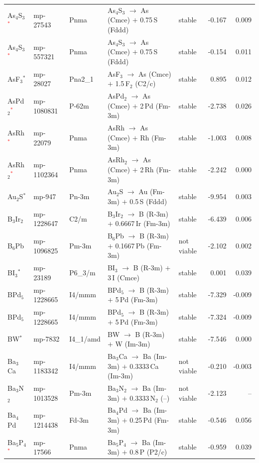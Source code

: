 \begin{longtable}{@{}ll l@{\hspace{4pt}} p{4.6cm} l@{\hspace{4pt}} rr@{}}
As$_{4}$S$_{3}$\textcolor{red}{$^*$} & mp-27543 & Pnma & As$_{4}$S$_{3}$ $\to$ As (Cmce) $+$ 0.75\,S (Fddd) & stable & -0.167 & 0.009 \\
As$_{4}$S$_{3}$\textcolor{red}{$^*$} & mp-557321 & Pnma & As$_{4}$S$_{3}$ $\to$ As (Cmce) $+$ 0.75\,S (Fddd) & stable & -0.154 & 0.011 \\
AsF$_{3}$$^*$ & mp-28027 & Pna2\_1 & AsF$_{3}$ $\to$ As (Cmce) $+$ 1.5\,F$_{2}$ (C2/c) & stable & 0.895 & 0.012 \\
AsPd$_{2}$\textcolor{red}{$^*$} & mp-1080831 & P-62m & AsPd$_{2}$ $\to$ As (Cmce) $+$ 2\,Pd (Fm-3m) & stable & -2.738 & 0.026 \\
AsRh\textcolor{red}{$^*$} & mp-22079 & Pnma & AsRh $\to$ As (Cmce) $+$ Rh (Fm-3m) & stable & -1.003 & 0.008 \\
AsRh$_{2}$\textcolor{red}{$^*$} & mp-1102364 & Pnma & AsRh$_{2}$ $\to$ As (Cmce) $+$ 2\,Rh (Fm-3m) & stable & -2.242 & 0.000 \\
Au$_{2}$S$^*$ & mp-947 & Pn-3m & Au$_{2}$S $\to$ Au (Fm-3m) $+$ 0.5\,S (Fddd) & stable & -9.954 & 0.003 \\
B$_{3}$Ir$_{2}$ & mp-1228647 & C2/m & B$_{3}$Ir$_{2}$ $\to$ B (R-3m) $+$ 0.6667\,Ir (Fm-3m) & stable & -6.439 & 0.006 \\
B$_{6}$Pb & mp-1096825 & Pm-3m & B$_{6}$Pb $\to$ B (R-3m) $+$ 0.1667\,Pb (Fm-3m) & not viable & -2.102 & 0.002 \\
BI$_{3}$$^*$ & mp-23189 & P6\_3/m & BI$_{3}$ $\to$ B (R-3m) $+$ 3\,I (Cmce) & stable & 0.001 & 0.039 \\
BPd$_{5}$ & mp-1228665 & I4/mmm & BPd$_{5}$ $\to$ B (R-3m) $+$ 5\,Pd (Fm-3m) & stable & -7.329 & -0.009 \\
BPd$_{5}$ & mp-1228665 & I4/mmm & BPd$_{5}$ $\to$ B (R-3m) $+$ 5\,Pd (Fm-3m) & stable & -7.324 & -0.009 \\
BW$^*$ & mp-7832 & I4\_1/amd & BW $\to$ B (R-3m) $+$ W (Im-3m) & stable & -7.546 & 0.000 \\
Ba$_{3}$Ca & mp-1183342 & I4/mmm & Ba$_{3}$Ca $\to$ Ba (Im-3m) $+$ 0.3333\,Ca (Im-3m) & not viable & -0.210 & -0.003 \\
Ba$_{3}$N$_{2}$ & mp-1013528 & Pm-3m & Ba$_{3}$N$_{2}$ $\to$ Ba (Im-3m) $+$ 0.3333\,N$_{2}$ (--) & not viable & -2.123 & -- \\
Ba$_{4}$Pd & mp-1214438 & Fd-3m & Ba$_{4}$Pd $\to$ Ba (Im-3m) $+$ 0.25\,Pd (Fm-3m) & stable & -0.546 & 0.056 \\
Ba$_{5}$P$_{4}$\textcolor{red}{$^*$} & mp-17566 & Pnma & Ba$_{5}$P$_{4}$ $\to$ Ba (Im-3m) $+$ 0.8\,P (P2/c) & stable & -0.959 & 0.039 \\

\end{longtable}
